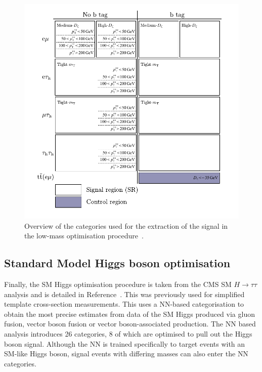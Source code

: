 \begin{figure}[!hbtp]
\centering
    \includegraphics[width=\textwidth]{Figures/low_mass_categories.pdf}
\caption[Diagram of the categories in the low-mass optimisation procedure.]{Overview of the categories used for the extraction of the signal in the low-mass optimisation procedure~\cite{CMS:2022rbd}.}
\label{fig:low_mass_categories}
\end{figure}

\subsection{Standard Model Higgs boson optimisation}

Finally, the \ac{SM} Higgs optimisation procedure is taken from the \ac{CMS} \ac{SM} $H \rightarrow \tau\tau$ analysis and is detailed in Reference~\cite{CMS:2022kdi}.
This was previously used for simplified template cross-section measurements.
This uses a \ac{NN}-based categorisation to obtain the most precise estimates from data of the \ac{SM} Higgs produced via gluon fusion, vector boson fusion or vector boson-associated production.
The \ac{NN} based analysis introduces 26 categories, 8 of which are optimised to pull out the Higgs boson signal.
Although the \ac{NN} is trained specifically to target events with an \ac{SM}-like Higgs boson, signal events with differing masses can also enter the \ac{NN} categories.

